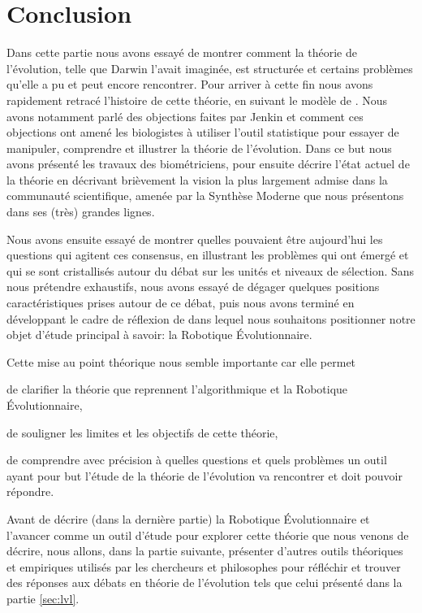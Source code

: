 \section{Conclusion}
Dans cette partie nous avons essayé de montrer comment la théorie de l'évolution, telle que Darwin l'avait imaginée, est structurée et certains problèmes qu'elle a pu et peut encore rencontrer. Pour arriver à cette fin nous avons rapidement retracé l'histoire de cette théorie, en suivant le modèle de \cite{gayon1991darwinetlapresdarwin}. Nous avons notamment parlé des objections faites par Jenkin et comment ces objections ont amené les biologistes à utiliser l'outil statistique pour essayer de manipuler, comprendre et illustrer la théorie de l'évolution. Dans ce but nous avons présenté les travaux des biométriciens, pour ensuite décrire l'état actuel de la théorie en décrivant brièvement la vision la plus largement admise dans la communauté scientifique, amenée par la Synthèse Moderne que nous présentons dans ses (très) grandes lignes.

Nous avons ensuite essayé de montrer quelles pouvaient être aujourd'hui les questions qui agitent ces consensus, en illustrant les problèmes qui ont émergé et qui se sont cristallisés autour du débat sur les unités et niveaux de sélection. Sans nous prétendre exhaustifs, nous avons essayé de dégager quelques positions caractéristiques prises autour de ce débat, puis nous avons terminé en développant le cadre de réflexion de \cite{godfrey2009darwinian} dans lequel nous souhaitons positionner notre objet d'étude principal à savoir: la Robotique \'Evolutionnaire.

Cette mise au point théorique nous semble importante car elle permet \begin{inparaenum}
\item de clarifier la théorie que reprennent l'algorithmique et la Robotique \'Evolutionnaire,
\item de souligner les limites et les objectifs de cette théorie,
\item de comprendre avec précision à quelles questions et quels problèmes un outil ayant pour but l'étude de la théorie de l'évolution va rencontrer et doit pouvoir répondre. 
\end{inparaenum}

Avant de décrire (dans la dernière partie) la Robotique \'Evolutionnaire et l'avancer comme un outil d'étude pour explorer cette théorie que nous venons de décrire, nous allons, dans la partie suivante, présenter d'autres outils théoriques et empiriques utilisés par les chercheurs et philosophes pour réfléchir et trouver des réponses aux débats en théorie de l'évolution tels que celui présenté dans la partie \ref{sec:lvl}.
